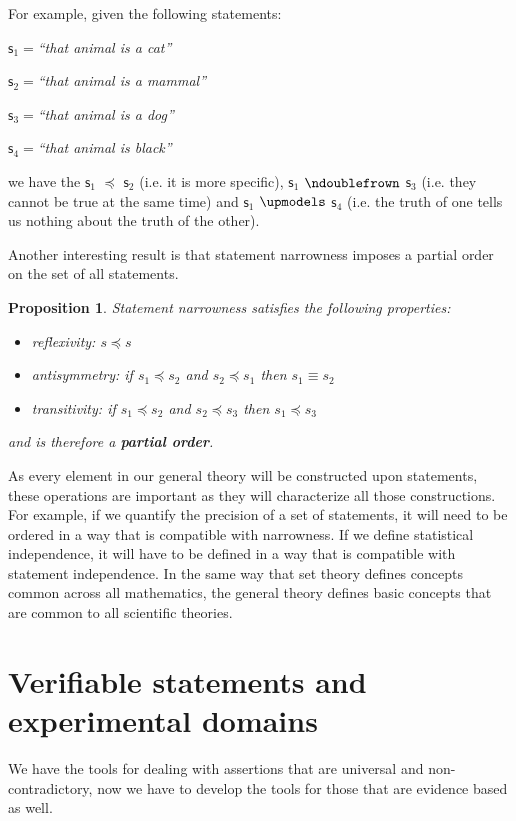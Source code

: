 \documentclass[letterpaper]{article}
\theoremstyle{plain}%
\newtheorem{prop}[thrm]{Proposition}
\theoremstyle{definition}
\theoremstyle{remark}
\numberwithin{equation}{section}
\def\ncomp{\ndoublefrown}
\def\narrower{\preccurlyeq}
\def\indep{\upmodels}
\newcommand{\stmt}[1][s] {\mathsf{#1}}
\newcommand{\statement}[1] {\emph{``#1''}}
\begin{document}
For example, given the following statements:
\begin{description}
	\item $\stmt_1=$\statement{that animal is a cat}
	\item $\stmt_2=$\statement{that animal is a mammal}
	\item $\stmt_3=$\statement{that animal is a dog}
	\item $\stmt_4=$\statement{that animal is black}
\end{description}
we have the $\stmt_1$ $\narrower$ $\stmt_2$ (i.e. it is more specific), $\stmt_1$ $\ncomp$ $\stmt_3$ (i.e. they cannot be true at the same time) and $\stmt_1$ $\indep$ $\stmt_4$ (i.e. the truth of one tells us nothing about the truth of the other).

Another interesting result is that statement narrowness imposes a partial order on the set of all statements.

\begin{prop}
	Statement narrowness satisfies the following properties:
	\begin{itemize}
		\item reflexivity: $s \narrower s$
		\item antisymmetry: if $s_1 \narrower s_2$ and  $s_2 \narrower s_1$ then $s_1 \equiv s_2$
		\item transitivity: if $s_1 \narrower s_2$ and $s_2 \narrower s_3$ then $s_1 \narrower s_3$
	\end{itemize}
	and is therefore a \textbf{partial order}.
\end{prop}

As every element in our general theory will be constructed upon statements, these operations are important as they will characterize all those constructions. For example, if we quantify the precision of a set of statements, it will need to be ordered in a way that is compatible with narrowness. If we define statistical independence, it will have to be defined in a way that is compatible with statement independence. In the same way that set theory defines concepts common across all mathematics, the general theory defines basic concepts that are common to all scientific theories.

\section{Verifiable statements and experimental domains}

We have the tools for dealing with assertions that are universal and non-contradictory, now we have to develop the tools for those that are evidence based as well.
\end{document}
